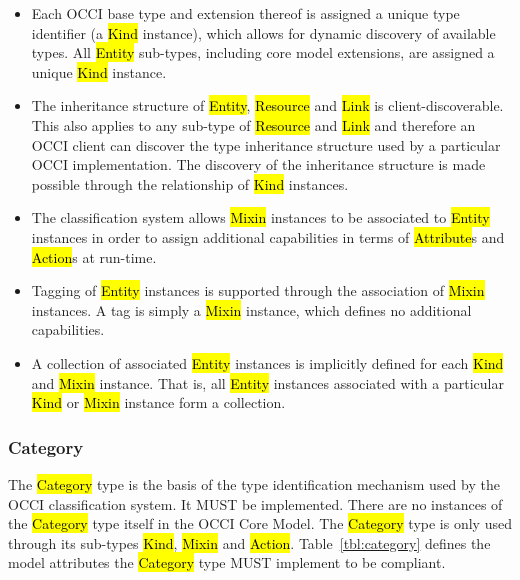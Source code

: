 \documentclass[10pt,a4paper]{article}
\begin{document}
\begin{itemize}
  \item Each OCCI base type and extension thereof is assigned a unique
    type identifier (a \hl{Kind} instance), which allows for dynamic
    discovery of available types. All \hl{Entity} sub-types, including
    core model extensions, are assigned a unique \hl{Kind} instance.

  \item The inheritance structure of \hl{Entity}, \hl{Resource} and
    \hl{Link} is client-discoverable. This also applies to any
    sub-type of \hl{Resource} and \hl{Link} and therefore an OCCI
    client can discover the type inheritance structure used by a
    particular OCCI implementation. The discovery of the inheritance
    structure is made possible through the relationship of \hl{Kind}
    instances.

  \item The classification system allows \hl{Mixin} instances to be
    associated to \hl{Entity} instances in order to assign additional
    capabilities in terms of \hl{Attribute}s and \hl{Action}s at
    run-time.

  \item Tagging of \hl{Entity} instances is supported through the
    association of \hl{Mixin} instances. A tag is simply a \hl{Mixin}
    instance, which defines no additional capabilities.

  \item A collection of associated \hl{Entity} instances is implicitly
    defined for each \hl{Kind} and \hl{Mixin} instance. That is, all
    \hl{Entity} instances associated with a particular \hl{Kind} or
    \hl{Mixin} instance form a collection.
\end{itemize}

\subsubsection{Category}
\label{sec:category}
The \hl{Category} type is the basis of the type identification
mechanism used by the OCCI classification system. It MUST be
implemented.
There are no instances of the \hl{Category} type itself in the OCCI Core Model.
The \hl{Category} type is only used through its sub-types \hl{Kind}, \hl{Mixin}
and \hl{Action}.
%
Table~\ref{tbl:category} defines the model attributes the \hl{Category} type
MUST implement to be compliant.
\end{document}
